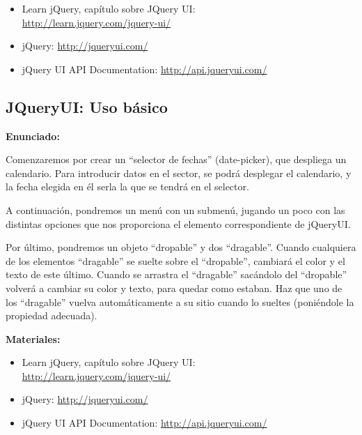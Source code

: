 \begin{itemize}
\item Learn jQuery, capítulo sobre JQuery UI: \\
  \url{http://learn.jquery.com/jquery-ui/}
\item jQuery: \url{http://jqueryui.com/}
\item jQuery UI API Documentation: \url{http://api.jqueryui.com/}
\end{itemize}

\subsection{JQueryUI: Uso básico}
\label{subsec:otras-jquery-basico}

\textbf{Enunciado:}

Comenzaremos por crear un ``selector de fechas'' (date-picker), que despliega un calendario. Para introducir datos en el sector, se podrá desplegar el calendario, y la fecha elegida en él serla la que se tendrá en el selector.

A continuación, pondremos un menú con un submenú, jugando un poco con las distintas opciones que nos proporciona el elemento correspondiente de jQueryUI.

Por último, pondremos un objeto ``dropable'' y dos ``dragable''. Cuando cualquiera de los elementos ``dragable'' se suelte sobre el ``dropable'', cambiará el color y el texto de este último. Cuando se arrastra el ``dragable'' sacándolo del ``dropable'' volverá a cambiar su color y texto, para quedar como estaban. Haz que uno de los ``dragable'' vuelva automáticamente a su sitio cuando lo sueltes (poniéndole la propiedad adecuada).

\textbf{Materiales:}

\begin{itemize}
\item Learn jQuery, capítulo sobre JQuery UI: \\
  \url{http://learn.jquery.com/jquery-ui/}
\item jQuery: \url{http://jqueryui.com/}
\item jQuery UI API Documentation: \url{http://api.jqueryui.com/}
\end{itemize}

